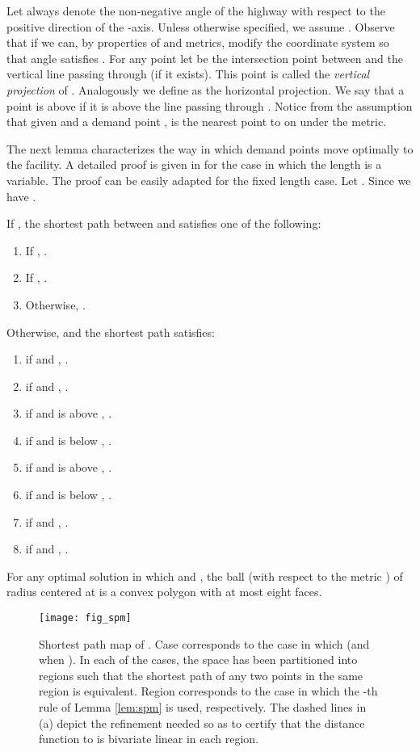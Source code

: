 \documentclass{llncs}
\begin{document}
Let  always denote the non-negative angle of the highway
with respect to the positive direction of the -axis. Unless
otherwise specified, we assume .
Observe that if  we can, by properties of
 and  metrics, modify the coordinate system so that angle
 satisfies .
For any point  let  be the intersection point between  and the vertical line passing through  (if it exists). This point is called the {\em vertical projection} of . Analogously we define  as the horizontal projection. We say that a point  is above  if it is above the line passing through . Notice from the
assumption  that given  and a
demand point ,  is the nearest point to  on  under the
 metric.

The next lemma characterizes the way in which demand points move
optimally to the facility. A detailed proof is given in \cite{bklv-lsfrtlovl-11} for the case in which the length is a variable. The proof can be easily adapted for the fixed length case.
Let . Since 
we have .





\begin{lemma}\label{lem:spm}\cite{bklv-lsfrtlovl-11}
If , the shortest path between  and  satisfies one of the following:
\begin{enumerate}
\item If ,  .
\item If , .
\item Otherwise, .
\end{enumerate}
Otherwise,   and the shortest path satisfies:
\begin{enumerate}
\item if  and , .
\item if  and , .
\item if  and  is above , .
\item if  and  is below , .
\item if  and  is above , .
\item if  and  is below , .
\item if  and , .
\item if  and , .
\end{enumerate}
\end{lemma}
\begin{corollary}\label{cor_convex}
For any optimal solution  in which  and , the ball (with respect to the metric ) of radius   centered at   is a convex polygon with at most eight faces.
\end{corollary}
\begin{figure}
\centering
\texttt{[image: fig\_spm]}
\caption{Shortest path map of . Case  corresponds to the case in which  (and  when ). In each of the cases, the space has been partitioned into regions such that the shortest path of any two points in the same region is equivalent. Region  corresponds to the case in which the -th rule of Lemma \ref{lem:spm} is used, respectively. The dashed lines in (a) depict the refinement needed so as to certify that the distance function to  is bivariate linear in each region.}
\label{fig_spm}
\end{figure}
\end{document}
